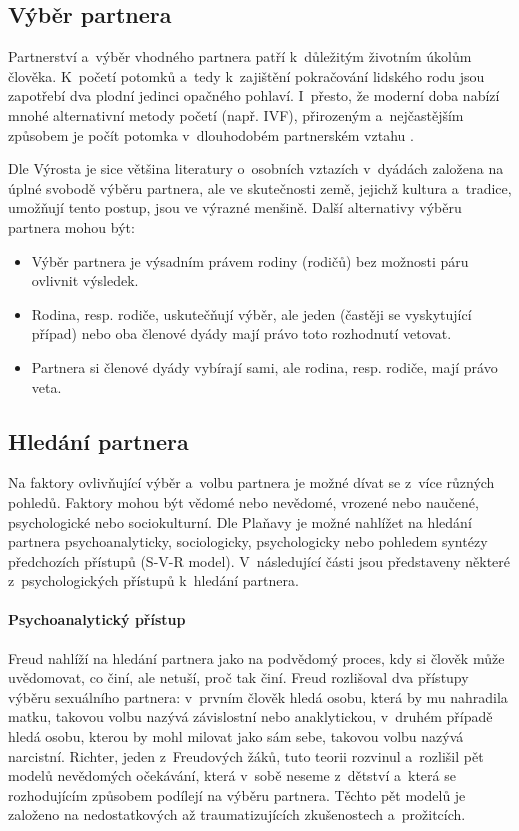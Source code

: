 \documentclass[a4paper, 12pt, notitlepage, oneside, numbers=noenddot]{report}
\begin{document}
\subsection{Výběr partnera}
Partnerství a~výběr vhodného partnera patří k~důležitým životním
úkolům člověka.  K~po\-če\-tí potomků a~tedy k~zajištění pokračování
lidského rodu jsou zapotřebí dva plodní jedinci opačného pohlaví.
I~přesto, že moderní doba nabízí mnohé alternativní metody početí
(např. IVF), přirozeným a~nejčastějším způsobem je počít potomka
v~dlouhodobém partnerském vztahu \citep{CSU2006}.

Dle Výrosta \citeyearpar{Vyrost2008} je sice většina literatury o~osobních
vztazích v~dyádách založena na úplné svobodě výběru partnera, ale ve
skutečnosti země, jejichž kultura a~tradice, umožňují tento postup, jsou
ve výrazné menšině. Další alternativy výběru partnera mohou být:

\begin{itemize}
\item Výběr partnera je výsadním právem rodiny (rodičů) bez možnosti
  páru ovlivnit výsledek.
\item Rodina, resp. rodiče, uskutečňují výběr, ale jeden (častěji se
  vyskytující případ) nebo oba členové dyády mají právo toto
  rozhodnutí vetovat.
\item Partnera si členové dyády vybírají sami, ale rodina, resp. rodiče,
  mají právo veta.
\end{itemize}

\subsection{Hledání partnera}
Na faktory ovlivňující výběr a~volbu partnera je možné dívat se z~více
různých pohledů.  Faktory mohou být vědomé nebo nevědomé, vrozené nebo
naučené, psychologické nebo sociokulturní.  Dle Plaňavy \citeyearpar{Planava1998}
je možné nahlížet na hledání partnera psychoanalyticky, sociologicky,
psychologicky nebo pohledem syntézy předchozích přístupů (S-V-R
model).  V~následující části jsou představeny některé
z~psychologických přístupů k~hledání partnera.

\paragraph{Psychoanalytický přístup}
Freud \citep{Planava1998} nahlíží na hledání partnera jako na
podvědomý proces, kdy si člověk může uvědomovat, co činí, ale netuší,
proč tak činí.  Freud rozlišoval dva přístupy výběru sexuálního
partnera: v~prvním člověk hledá osobu, která by mu nahradila matku,
takovou volbu nazývá závislostní nebo anakly\-tic\-kou, v~druhém případě
hledá osobu, kterou by mohl milovat jako sám sebe, takovou volbu
nazývá narcistní.  Richter, jeden z~Freudových žáků, tuto teorii
rozvinul a~rozlišil pět modelů nevědomých očekávání, která v~sobě
neseme z~dětství a~která se rozhodujícím způsobem podílejí na výběru
partnera. Těchto pět modelů je založeno na nedostatkových až
traumatizujících zkušenostech a~prožitcích.
\end{document}
